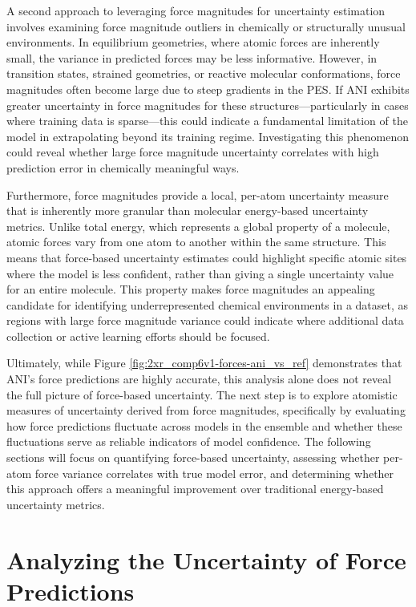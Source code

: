 A second approach to leveraging force magnitudes for uncertainty estimation involves examining force magnitude outliers in chemically or structurally unusual environments. In equilibrium geometries, where atomic forces are inherently small, the variance in predicted forces may be less informative. However, in transition states, strained geometries, or reactive molecular conformations, force magnitudes often become large due to steep gradients in the PES. If ANI exhibits greater uncertainty in force magnitudes for these structures—particularly in cases where training data is sparse—this could indicate a fundamental limitation of the model in extrapolating beyond its training regime. Investigating this phenomenon could reveal whether large force magnitude uncertainty correlates with high prediction error in chemically meaningful ways.

Furthermore, force magnitudes provide a local, per-atom uncertainty measure that is inherently more granular than molecular energy-based uncertainty metrics. Unlike total energy, which represents a global property of a molecule, atomic forces vary from one atom to another within the same structure. This means that force-based uncertainty estimates could highlight specific atomic sites where the model is less confident, rather than giving a single uncertainty value for an entire molecule. This property makes force magnitudes an appealing candidate for identifying underrepresented chemical environments in a dataset, as regions with large force magnitude variance could indicate where additional data collection or active learning efforts should be focused.

Ultimately, while Figure \ref{fig:2xr_comp6v1-forces-ani_vs_ref} demonstrates that ANI’s force predictions are highly accurate, this analysis alone does not reveal the full picture of force-based uncertainty. The next step is to explore atomistic measures of uncertainty derived from force magnitudes, specifically by evaluating how force predictions fluctuate across models in the ensemble and whether these fluctuations serve as reliable indicators of model confidence. The following sections will focus on quantifying force-based uncertainty, assessing whether per-atom force variance correlates with true model error, and determining whether this approach offers a meaningful improvement over traditional energy-based uncertainty metrics.

\section{Analyzing the Uncertainty of Force Predictions}
\label{sec:analyzing_force_uncertainty}

